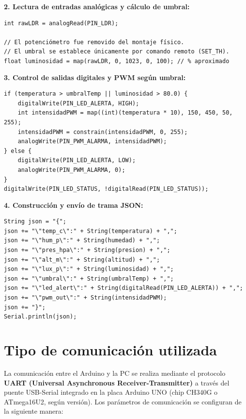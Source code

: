 \textbf{2. Lectura de entradas analógicas y cálculo de umbral:}

\begin{verbatim}
int rawLDR = analogRead(PIN_LDR);

// El potenciómetro fue removido del montaje físico.
// El umbral se establece únicamente por comando remoto (SET_TH).
float luminosidad = map(rawLDR, 0, 1023, 0, 100); // % aproximado
\end{verbatim}

\textbf{3. Control de salidas digitales y PWM según umbral:}

\begin{verbatim}
if (temperatura > umbralTemp || luminosidad > 80.0) {
    digitalWrite(PIN_LED_ALERTA, HIGH);
    int intensidadPWM = map((int)(temperatura * 10), 150, 450, 50, 255);
    intensidadPWM = constrain(intensidadPWM, 0, 255);
    analogWrite(PIN_PWM_ALARMA, intensidadPWM);
} else {
    digitalWrite(PIN_LED_ALERTA, LOW);
    analogWrite(PIN_PWM_ALARMA, 0);
}
digitalWrite(PIN_LED_STATUS, !digitalRead(PIN_LED_STATUS));
\end{verbatim}

\textbf{4. Construcción y envío de trama JSON:}

\begin{verbatim}
String json = "{";
json += "\"temp_c\":" + String(temperatura) + ",";
json += "\"hum_p\":" + String(humedad) + ",";
json += "\"pres_hpa\":" + String(presion) + ",";
json += "\"alt_m\":" + String(altitud) + ",";
json += "\"lux_p\":" + String(luminosidad) + ",";
json += "\"umbral\":" + String(umbralTemp) + ",";
json += "\"led_alert\":" + String(digitalRead(PIN_LED_ALERTA)) + ",";
json += "\"pwm_out\":" + String(intensidadPWM);
json += "}";
Serial.println(json);
\end{verbatim}

\label{ch:comunicacion-pc}

\section{Tipo de comunicación utilizada}

La comunicación entre el Arduino y la PC se realiza mediante el protocolo \textbf{UART (Universal Asynchronous Receiver-Transmitter)} a través del puente USB-Serial integrado en la placa Arduino UNO (chip CH340G o ATmega16U2, según versión). Los parámetros de comunicación se configuran de la siguiente manera:

